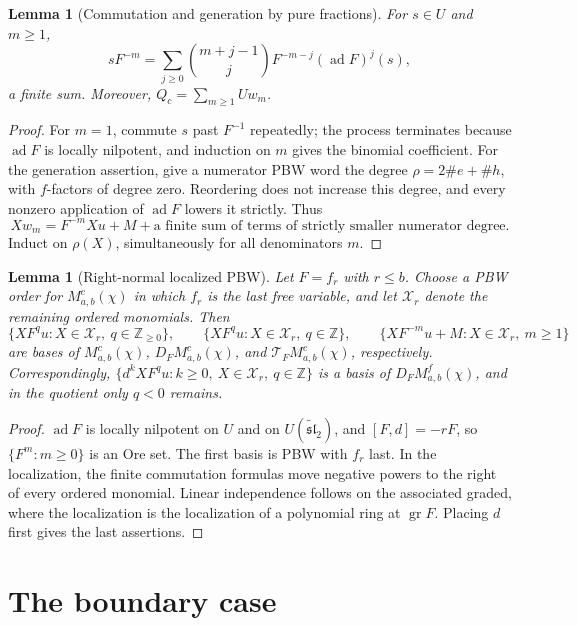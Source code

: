 \documentclass[11pt,a4paper]{article}
\newcommand{\Z}{\mathbb Z}
\newcommand{\slt}{\widetilde{\mathfrak{sl}}_2}
\newcommand{\ad}{\operatorname{ad}}
\newcommand{\X}{\mathcal X}
\newcommand{\T}{\mathcal T}
\theoremstyle{plainupright}
\newtheorem{lemma}[proposition]{Lemma}
\begin{document}
\begin{lemma}[Commutation and generation by pure fractions]\label{lem:fractions}
For \(s\in U\) and \(m\ge1\),
\begin{equation}\label{eq:commute}
sF^{-m}=\sum_{j\ge0}\binom{m+j-1}{j}F^{-m-j}(\ad F)^j(s),
\end{equation}
a finite sum. Moreover, \(Q_c=\sum_{m\ge1}Uw_m\).
\end{lemma}

\begin{proof}
For \(m=1\), commute \(s\) past \(F^{-1}\) repeatedly; the process terminates
because \(\ad F\) is locally nilpotent, and induction on \(m\) gives the
binomial coefficient. For the generation assertion, give a numerator PBW word
the degree \(\rho=2\#e+\#h\), with \(f\)-factors of degree zero. Reordering
does not increase this degree, and every nonzero application of \(\ad F\)
lowers it strictly. Thus
\[
Xw_m=F^{-m}Xu+M+\text{a finite sum of terms of strictly smaller numerator degree}.
\]
Induct on \(\rho(X)\), simultaneously for all denominators \(m\).
\end{proof}

\begin{lemma}[Right-normal localized PBW]\label{lem:right-pbw}
Let \(F=f_r\) with \(r\le b\). Choose a PBW order for \(M^c_{a,b}(\chi)\) in
which \(f_r\) is the \emph{last} free variable, and let \(\X_r\) denote the
remaining ordered monomials. Then
\[
\{XF^qu:X\in\X_r,\ q\in\Z_{\ge0}\},\qquad
\{XF^qu:X\in\X_r,\ q\in\Z\},\qquad
\{XF^{-m}u+M:X\in\X_r,\ m\ge1\}
\]
are bases of \(M^c_{a,b}(\chi)\), \(D_FM^c_{a,b}(\chi)\), and
\(\T_FM^c_{a,b}(\chi)\), respectively. Correspondingly,
\(\{d^kXF^qu:k\ge0,\ X\in\X_r,\ q\in\Z\}\) is a basis of
\(D_FM^f_{a,b}(\chi)\), and in the quotient only \(q<0\) remains.
\end{lemma}

\begin{proof}
\(\ad F\) is locally nilpotent on \(U\) and on \(U(\slt)\), and
\([F,d]=-rF\), so \(\{F^m:m\ge0\}\) is an Ore set. The first basis is PBW with
\(f_r\) last. In the localization, the finite commutation formulas move
negative powers to the right of every ordered monomial. Linear independence
follows on the associated graded, where the localization is the localization
of a polynomial ring at \(\operatorname{gr}F\). Placing \(d\) first gives the
last assertions.
\end{proof}

\section{The boundary case}\label{sec:boundary}
\end{document}
